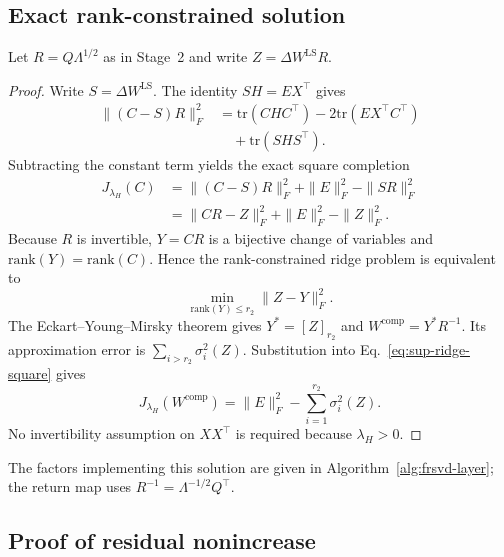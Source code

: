 \subsection{Exact rank-constrained solution}\label{sup:eigenspace-projection}

Let $R=Q\Lambda^{1/2}$ as in Stage~2 and write $Z=\Delta W^{\mathrm{LS}}R$.

\begin{proof}
Write $S=\Delta W^{\mathrm{LS}}$. The identity $SH=EX^\top$ gives
\begin{equation}
\begin{aligned}
\|(C-S)R\|_F^2
&=\mathrm{tr}(CHC^\top)-2\mathrm{tr}(EX^\top C^\top) \\
&\quad+\mathrm{tr}(SHS^\top).
\end{aligned}
\end{equation}
Subtracting the constant term yields the exact square completion
\begin{equation}
\begin{aligned}
J_{\lambda_H}(C)
&=\|(C-S)R\|_F^2+\|E\|_F^2-\|SR\|_F^2 \\
&=\|CR-Z\|_F^2+\|E\|_F^2-\|Z\|_F^2.
\end{aligned}
\label{eq:sup-ridge-square}
\end{equation}
Because $R$ is invertible, $Y=CR$ is a bijective change of variables and $\mathrm{rank}(Y)=\mathrm{rank}(C)$. Hence the rank-constrained ridge problem is equivalent to
\begin{equation}
\min_{\mathrm{rank}(Y)\le r_2}\|Z-Y\|_F^2.
\end{equation}
The Eckart--Young--Mirsky theorem gives $Y^*=[Z]_{r_2}$ and $W^{\mathrm{comp}}=Y^*R^{-1}$. Its approximation error is $\sum_{i>r_2}\sigma_i^2(Z)$. Substitution into Eq.~\eqref{eq:sup-ridge-square} gives
\begin{equation}
J_{\lambda_H}(W^{\mathrm{comp}})
=\|E\|_F^2-\sum_{i=1}^{r_2}\sigma_i^2(Z).
\label{eq:ridge-optimum}
\end{equation}
No invertibility assumption on $XX^\top$ is required because $\lambda_H>0$.
\end{proof}

The factors implementing this solution are given in Algorithm~\ref{alg:frsvd-layer}; the return map uses $R^{-1}=\Lambda^{-1/2}Q^\top$.

\subsection{Proof of residual nonincrease}\label{sup:proof-lemma1}

